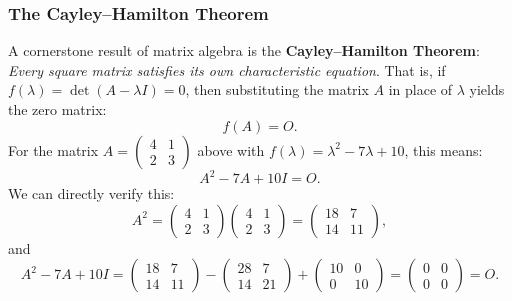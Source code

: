 \subsubsection*{The Cayley--Hamilton Theorem}
A cornerstone result of matrix algebra is the \textbf{Cayley--Hamilton Theorem}: \emph{Every square matrix satisfies its own characteristic equation}. That is, if $f(\lambda) = \det(A - \lambda I) = 0$, then substituting the matrix $A$ in place of $\lambda$ yields the zero matrix:
\[
f(A) = O.
\]
For the matrix $A = \begin{pmatrix} 4 & 1 \\ 2 & 3 \end{pmatrix}$ above with $f(\lambda) = \lambda^2 - 7\lambda + 10$, this means:
\[
A^2 - 7A + 10I = O.
\]
We can directly verify this:
\[
A^2 = \begin{pmatrix} 4 & 1 \\ 2 & 3 \end{pmatrix} \begin{pmatrix} 4 & 1 \\ 2 & 3 \end{pmatrix} = \begin{pmatrix} 18 & 7 \\ 14 & 11 \end{pmatrix},
\]
and
\[
A^2 - 7A + 10I = \begin{pmatrix} 18 & 7 \\ 14 & 11 \end{pmatrix} - \begin{pmatrix} 28 & 7 \\ 14 & 21 \end{pmatrix} + \begin{pmatrix} 10 & 0 \\ 0 & 10 \end{pmatrix} = \begin{pmatrix} 0 & 0 \\ 0 & 0 \end{pmatrix} = O.
\]


